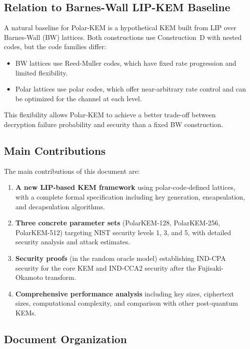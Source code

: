 \documentclass[11pt,a4paper]{article}
\newcommand{\polarKem}{\textsf{Polar-KEM}\xspace}
\newcommand{\lipPrb}{\textsf{LIP}\xspace}
\newcommand{\INDCPA}{\textsf{IND-CPA}\xspace}
\newcommand{\INDCCA}{\textsf{IND-CCA2}\xspace}
\begin{document}
\subsection{Relation to Barnes-Wall LIP-KEM Baseline}\label{sec:relation-bw}

A natural baseline for \polarKem is a hypothetical KEM built from \lipPrb over Barnes-Wall (BW) lattices. Both constructions use Construction~D with nested codes, but the code families differ:

\begin{itemize}[leftmargin=2em]
\item BW lattices use Reed-Muller codes, which have fixed rate progression and limited flexibility.
\item Polar lattices use polar codes, which offer near-arbitrary rate control and can be optimized for the channel at each level.
\end{itemize}

This flexibility allows \polarKem to achieve a better trade-off between decryption failure probability and security than a fixed BW construction.

\subsection{Main Contributions}\label{sec:contributions}

The main contributions of this document are:

\begin{enumerate}[leftmargin=2em]
\item \textbf{A new \lipPrb-based KEM framework} using polar-code-defined lattices, with a complete formal specification including key generation, encapsulation, and decapsulation algorithms.
\item \textbf{Three concrete parameter sets} (\textsf{PolarKEM-128}, \textsf{PolarKEM-256}, \textsf{PolarKEM-512}) targeting NIST security levels 1, 3, and 5, with detailed security analysis and attack estimates.
\item \textbf{Security proofs} (in the random oracle model) establishing \INDCPA security for the core KEM and \INDCCA security after the Fujisaki-Okamoto transform.
\item \textbf{Comprehensive performance analysis} including key sizes, ciphertext sizes, computational complexity, and comparison with other post-quantum KEMs.
\end{enumerate}

\subsection{Document Organization}\label{sec:organization}
\end{document}
